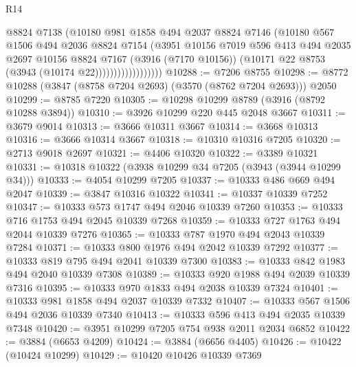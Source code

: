 \begin{lexlean}{R14}
\begin{coremodule}
                            @8824
                            @7138
                            (@10180
                              @981
                              @1858
                              @494
                              @2037
                              @8824
                              @7146
                              (@10180
                                @567
                                @1506
                                @494
                                @2036
                                @8824
                                @7154
                                (@3951
                                  @10156
                                  @7019
                                  @596
                                  @413
                                  @494
                                  @2035
                                  @2697
                                  @10156
                                  @8824
                                  @7167
                                  (@3916 (@7170 @10156))
                                  (@10171 @22 @8753 (@3943 (@10174 @22))))))))))))))))))
@10288 := @7206 @8755
@10298 := @8772 @10288 (@3847 (@8758 @7204 @2693) (@3570 (@8762 @7204 @2693))) @2050
@10299 := @8785 @7220
@10305 := @10298 @10299 @8789 (@3916 (@8792 @10288 @3894))
@10310 := @3926 @10299 @220 @445 @2048 @3667
@10311 := @3679 @9014
@10313 := @3666 @10311 @3667
@10314 := @3668 @10313
@10316 := @3666 @10314 @3667
@10318 := @10310 @10316 @7205
@10320 := @2713 @9018 @2697
@10321 := @4406 @10320
@10322 := @3389 @10321
@10331 := @10318 @10322 (@3938 @10299 @34 @7205 (@3943 (@3944 @10299 @34)))
@10333 := @4054 @10299 @7205
@10337 := @10333 @486 @669 @494 @2047
@10339 := @3847 @10316 @10322
@10341 := @10337 @10339 @7252
@10347 := @10333 @573 @1747 @494 @2046 @10339 @7260
@10353 := @10333 @716 @1753 @494 @2045 @10339 @7268
@10359 := @10333 @727 @1763 @494 @2044 @10339 @7276
@10365 := @10333 @787 @1970 @494 @2043 @10339 @7284
@10371 := @10333 @800 @1976 @494 @2042 @10339 @7292
@10377 := @10333 @819 @795 @494 @2041 @10339 @7300
@10383 := @10333 @842 @1983 @494 @2040 @10339 @7308
@10389 := @10333 @920 @1988 @494 @2039 @10339 @7316
@10395 := @10333 @970 @1833 @494 @2038 @10339 @7324
@10401 := @10333 @981 @1858 @494 @2037 @10339 @7332
@10407 := @10333 @567 @1506 @494 @2036 @10339 @7340
@10413 := @10333 @596 @413 @494 @2035 @10339 @7348
@10420 := @3951 @10299 @7205 @754 @938 @2011 @2034 @6852
@10422 := @3884 (@6653 @4209)
@10424 := @3884 (@6656 @4405)
@10426 := @10422 (@10424 @10299)
@10429 := @10420 @10426 @10339 @7369

\end{coremodule}
\end{lexlean}
